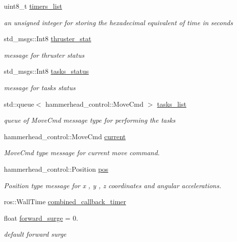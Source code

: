 \begin{DoxyCompactItemize}
uint8\+\_\+t \hyperlink{classControl_ac06b4442ca2a5141fe6d8637f0f4a169}{timers\+\_\+list}
\begin{DoxyCompactList}\small\item\em an unsigned integer for storing the hexadecimal equivalent of time in seconds \end{DoxyCompactList}\item 
std\+\_\+msgs\+::\+Int8 \hyperlink{classControl_a357ebd67bec91c792a7d904624a21ac6}{thruster\+\_\+stat}
\begin{DoxyCompactList}\small\item\em message for thruster status \end{DoxyCompactList}\item 
std\+\_\+msgs\+::\+Int8 \hyperlink{classControl_a33f504fc4fc4d72aece54ac1d54e0dce}{tasks\+\_\+status}
\begin{DoxyCompactList}\small\item\em message for tasks status \end{DoxyCompactList}\item 
std\+::queue$<$ hammerhead\+\_\+control\+::\+Move\+Cmd $>$ \hyperlink{classControl_a8253a25dca4732520650a20d04bc444c}{tasks\+\_\+list}
\begin{DoxyCompactList}\small\item\em queue of Move\+Cmd message type for performing the tasks \end{DoxyCompactList}\item 
hammerhead\+\_\+control\+::\+Move\+Cmd \hyperlink{classControl_af74f0b009e6e0835715c5c84e5e9fdd5}{current}
\begin{DoxyCompactList}\small\item\em Move\+Cmd type message for current move command. \end{DoxyCompactList}\item 
hammerhead\+\_\+control\+::\+Position \hyperlink{classControl_a01d178fc453eb32517b91e771ef0c865}{pos}
\begin{DoxyCompactList}\small\item\em Position type message for x , y , z coordinates and angular accelerations. \end{DoxyCompactList}\item 
ros\+::\+Wall\+Time \hyperlink{classControl_a7a1dd562bded08231a44823a213afbee}{combined\+\_\+callback\+\_\+timer}
\item 
float \hyperlink{classControl_af4f6b06288fafd78cd2cb384a1a16310}{forward\+\_\+surge} = 0.
\begin{DoxyCompactList}\small\item\em default forward surge \end{DoxyCompactList}\item 

\end{DoxyCompactItemize}
